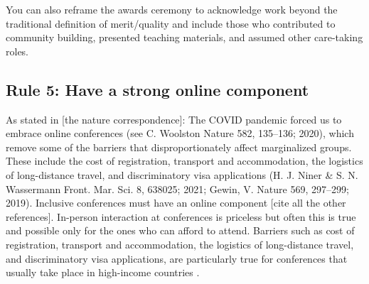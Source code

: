 \documentclass[10pt,letterpaper]{article}
\begin{document}
You can also reframe the awards ceremony to acknowledge work beyond the traditional definition of merit/quality and include those who contributed to community building, presented teaching materials, and assumed other care-taking roles.


\subsection*{Rule 5: Have a strong online component} 
\label{rule_online}

As stated in [the nature correspondence]: The COVID pandemic forced us to embrace online conferences (see C. Woolston Nature 582, 135–136; 2020), which remove some of the barriers that disproportionately affect marginalized groups. These include the cost of registration, transport and accommodation, the logistics of long-distance travel, and discriminatory visa applications (H. J. Niner \& S. N. Wassermann Front. Mar. Sci. 8, 638025; 2021; Gewin, V. Nature 569, 297–299; 2019). Inclusive conferences must have an online component [cite all the other references].
In-person interaction at conferences is priceless but often this is true and possible only for the ones who can afford to attend. 
Barriers such as cost of registration, transport and accommodation, the logistics of long-distance travel, and discriminatory visa applications, are particularly true for conferences that usually take place in high-income countries \cite{arendDisparityConferenceRegistration2019,gewinWhatScientistsShould2019,jooKeepOnlineOption2021}. 
\end{document}

